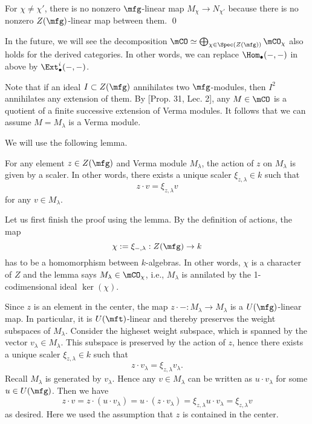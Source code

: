 	For $\chi\neq \chi'$, there is no nonzero $\mfg$-linear map $M_\chi \to N_{\chi'}$ because there is no nonzero $Z(\mfg)$-linear map between them. 
\qed

\begin{rem}
	In the future, we will see the decomposition $\mCO \simeq \bigoplus_{\chi\in \Spec(Z(\mfg))} \mCO_\chi$ also holds for the derived categories. In other words, we can replace $\Hom_\bullet(-,-)$ in above by $\Ext^i_\bullet(-,-)$.
\end{rem}



	Note that if an ideal $I\subset Z(\mfg)$ annihilates two $\mfg$-modules, then $I^2$ annihilates any extension of them. By [Prop. 31, Lec. 2], any $M\in \mCO$ is a quotient of a finite successive extension of Verma modules. It follows that we can assume $M=M_\lambda$ is a Verma module. 

	We will use the following lemma.

\begin{lem}
	\label{lem-central-characer-Verma}
	For any element $z\in Z(\mfg)$ and Verma module $M_\lambda$, the action of $z$ on $M_\lambda$ is given by a scaler. In other words, there exists a unique scaler $\xi_{z,\lambda}\in k$ such that
	\[
		z\cdot v = \xi_{z,\lambda}v
	\]
	for any $v\in M_\lambda$.
\end{lem}
	
	Let us first finish the proof using the lemma. By the definition of actions, the map 
	\[
		\chi:=\xi_{-,\lambda}:Z(\mfg) \to k
	\]
	has to be a homomorphism between $k$-algebras. In other words, $\chi$ is a character of $Z$ and the lemma says $M_\lambda \in \mCO_\chi$, i.e., $M_\lambda$ is annilated by the 1-codimensional ideal $\ker(\chi)$.

	Since $z$ is an element in the center, the map $z\cdot - :M_\lambda \to M_\lambda$ is a $U(\mfg)$-linear map. In particular, it is $U(\mft)$-linear and thereby preserves the weight subspaces of $M_\lambda$. Consider the higheset weight subspace, which is spanned by the vector $v_\lambda\in M_\lambda$. This subspace is preserved by the action of $z$, hence there exists a unique scaler $\xi_{z,\lambda}\in k$ such that
	\[
		z\cdot v_\lambda = \xi_{z,\lambda}v_\lambda.
	\]
	Recall $M_\lambda$ is generated by $v_\lambda$. Hence any $v\in M_\lambda$ can be written as $u\cdot v_\lambda$ for some $u\in U(\mfg)$. Then we have
	\[
		z\cdot v = z \cdot (u \cdot v_\lambda) = u\cdot (z\cdot v_\lambda) = \xi_{z,\lambda} u\cdot v_\lambda = \xi_{z,\lambda}v
	\]
	as desired. Here we used the assumption that $z$ is contained in the center.


